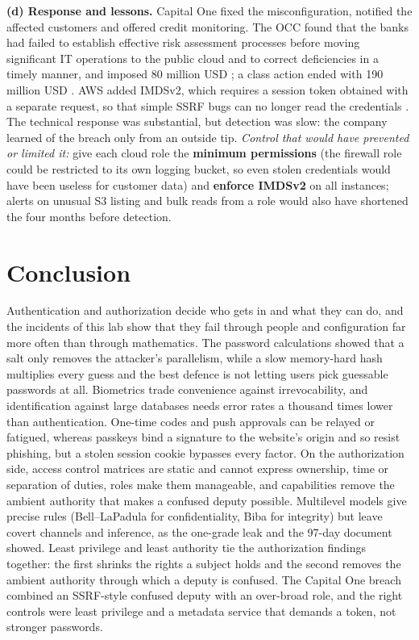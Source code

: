 \documentclass[11pt,a4paper]{article}
\begin{document}
\textbf{(d) Response and lessons.} Capital One fixed the misconfiguration, notified the affected customers and
offered credit monitoring. The OCC found that the banks had failed to establish effective risk assessment
processes before moving significant IT operations to the public cloud and to correct deficiencies in a timely
manner, and imposed 80 million USD \cite{occ}; a class action ended with 190 million USD \cite{conviction}.
AWS added IMDSv2, which requires a session token obtained with a separate request, so that simple SSRF bugs can no
longer read the credentials \cite{imds}. The technical response was substantial, but detection was
slow: the company learned of the breach only from an outside tip. \emph{Control that would have prevented or
limited it:} give each cloud role the \textbf{minimum permissions} (the firewall role could be restricted to
its own logging bucket, so even stolen credentials would have been useless for customer data) and \textbf{enforce
IMDSv2} on all instances; alerts on unusual S3 listing and bulk reads from a role would also have shortened the four
months before detection.

\section*{Conclusion}
Authentication and authorization decide who gets in and what they can do, and the incidents of this lab show
that they fail through people and configuration far more often than through mathematics. The password
calculations showed that a salt only removes the attacker's parallelism, while a slow memory-hard hash multiplies
every guess and the best defence is not letting users pick guessable passwords at all. Biometrics trade
convenience against irrevocability, and identification against large databases needs error rates a thousand
times lower than authentication. One-time codes and push approvals can be relayed or fatigued, whereas passkeys
bind a signature to the website's origin and so resist phishing, but a stolen session cookie bypasses every
factor. On the authorization side, access control matrices are static and cannot express ownership, time or
separation of duties, roles make them manageable, and capabilities remove the ambient authority that makes a
confused deputy possible. Multilevel models give precise rules (Bell--LaPadula for confidentiality, Biba for
integrity) but leave covert channels and inference, as the one-grade leak and the 97-day document showed. Least privilege and least authority tie the
authorization findings together: the first shrinks the rights a subject holds and the second removes the ambient
authority through which a deputy is confused. The Capital One breach combined an SSRF-style confused deputy with an
over-broad role, and the right controls were least privilege and a metadata service that demands a token, not
stronger passwords.
\end{document}
